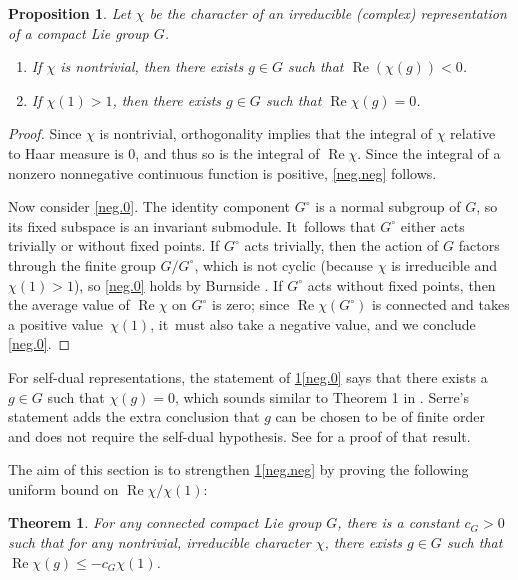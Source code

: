\documentclass[JEP,XML,SOM,Unicode,NoFloatCountersInSection,published]{cedram}
\newenvironment{enumeratea}
{\bgroup\def\theenumi{\alph{enumi}}\def\theenumii{\roman{enumii}}\begin{enumerate}}
{\end{enumerate}\egroup}
\newtheorem{thm}[equation]{Theorem}
\newtheorem{prop}[equation]{Proposition}
\theoremstyle{definition}
\let\ic\circ
\DeclareMathOperator{\RE}{Re}
\begin{document}
\begin{prop} \label{neg.val}
Let $\chi$ be the character of an irreducible (complex) representation of a
compact Lie group $G$.
\begin{enumeratea}
\item \label{neg.neg} If $\chi$ is nontrivial, then there exists $g\in G$ such that $\RE(\chi(g))<0$.
\item \label{neg.0} If $\chi(1) > 1$, then there exists $g \in G$ such that $\RE \chi(g) = 0$.
\end{enumeratea}
\end{prop}

\begin{proof}
Since $\chi$ is nontrivial, orthogonality implies that the
integral of $\chi$ relative to Haar measure is 0, and thus so is the
integral of $\RE\chi$. Since the integral of a nonzero nonnegative
continuous function is positive, \eqref{neg.neg} follows.

Now consider \eqref{neg.0}. The identity component $G^\ic$ is a normal subgroup of $G$, so its fixed subspace is an invariant submodule. It~follows that $G^\ic$ either acts trivially or without fixed points.
If $G^\ic$ acts trivially, then the action of $G$ factors through the finite group $G/G^\ic$, which is not cyclic (because $\chi$ is irreducible and $\chi(1) > 1$), so \eqref{neg.0} holds by Burnside \cite[p.\,115]{Burnside:tr}. If $G^\ic$ acts without fixed points, then the average value of $\RE \chi$ on $G^\ic$ is zero; since $\RE \chi(G^\ic)$ is connected and takes a positive value~$\chi(1)$, it~must also take a negative value, and we conclude \eqref{neg.0}.
\end{proof}

For self-dual representations, the statement of \ref{neg.val}\eqref{neg.0} says that there exists a $g \in G$ such that $\chi(g) = 0$, which
sounds similar to Theorem 1 in \cite{Se:trace}. Serre's statement adds the extra conclusion that $g$ can be chosen to be of finite order and does not require the self-dual hypothesis. See \cite{Se:zeros} for a proof of that result.

The aim of this section is to strengthen \ref{neg.val}\eqref{neg.neg} by proving the following uniform
bound on $\RE\chi / \chi(1)$:
\begin{thm} \label{neg.thm}
For any connected compact Lie group $G$, there is a constant $c_G>0$ such that for
any nontrivial, irreducible character $\chi$, there exists $g\in G$ such that
$\RE\chi(g) \le -c_G\chi(1)$.
\end{thm}
\end{document}
